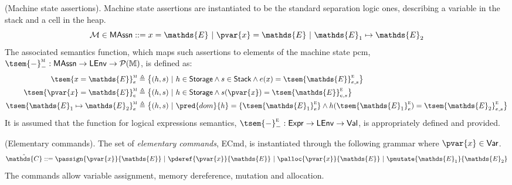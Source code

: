 \begin{defn}
	(Machine state assertions).
	Machine state assertions are instantiated to be the standard separation logic ones, describing a variable in the stack and a cell in the heap.
		\[
			\mathcal{M} \in \mathsf{MAssn} ::= x = \mathds{E}\ |\ \pvar{x} = \mathds{E}\ |\ \mathds{E}_1 \mapsto \mathds{E}_2
		\]
		The associated semantics function, which maps such assertions to elements of the machine state pcm, $\tsem{-}_-^\textsc{m} : \mathsf{MAssn} \rightarrow \mathsf{LEnv} \rightarrow \mathcal{P}(\mathbb{M})$, is defined as:
		\begin{align*}
			\tsem{x = \mathds{E}}^\textsc{m}_e &\triangleq \big\{ (h, s)\ |\ h \in \mathsf{Storage} \land s \in \mathsf{Stack} \land  e(x) = \tsem{\mathds{E}}^\textsc{e}_{e, s} \big\}
			\\
			\tsem{\pvar{x} = \mathds{E}}^\textsc{m}_e &\triangleq \big\{ (h, s)\ |\ h \in \mathsf{Storage} \land s(\pvar{x}) = \tsem{\mathds{E}}^\textsc{e}_{e, s} \big\}
			\\
			\tsem{\mathds{E}_1 \mapsto \mathds{E}_2}_e^\textsc{m} &\triangleq \big\{ (h, s)\ |\ \pred{dom}{h} = \{\tsem{\mathds{E}_1}_e^\textsc{e}\} \land h(\tsem{\mathds{E}_1}_e^\textsc{e}) = \tsem{\mathds{E}_2}_{e,s}^\textsc{e} \big\}
		\end{align*}
		It is assumed that the function for logical expressions semantics, $\tsem{-}_-^\textsc{e} : \mathsf{Expr} \rightarrow \mathsf{LEnv} \rightarrow \mathsf{Val}$, is appropriately defined and provided.
\end{defn}

\begin{defn}
	(Elementary commands).
	The set of \emph{elementary commands}, \textsf{ECmd}, is instantiated through the following grammar where $\pvar{x} \in \mathsf{Var}$.
	\[
		\hat{\mathds{C}} ::=
			\passign{\pvar{x}}{\mathds{E}}\
			|\ \pderef{\pvar{x}}{\mathds{E}}\
			|\ \palloc{\pvar{x}}{\mathds{E}}\
			|\ \pmutate{\mathds{E}_1}{\mathds{E}_2}
	\]
	The commands allow variable assignment, memory dereference, mutation and allocation.
\end{defn}

